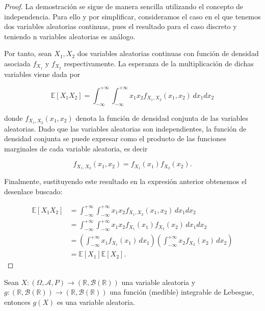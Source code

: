 \begin{proof}
    La demostración se sigue de manera sencilla utilizando el concepto de independencia. Para ello y por simplificar, consideramos el caso en el que tenemos dos variables aleatorias continuas, pues el resultado para el caso discreto y teniendo n variables aleatorias es análogo.\newline

    Por tanto, sean $X_1, X_2$ dos variables aleatorias continuas con función de densidad asociada $f_{X_1}$ y $f_{X_2}$ respectivamente. La esperanza de la multiplicación de dichas variables viene dada por

    \[ \mathbb{E}[X_1X_2] = \int_{-\infty}^{+\infty}\int_{-\infty}^{+\infty} x_1x_2 f_{X_1, X_2} (x_1, x_2) \, dx_1dx_2 \]

    donde $f_{X_1, X_2} (x_1, x_2)$ denota la función de densidad conjunta de las variables aleatorias. Dado que las variables aleatorias son independientes, la función de densidad conjunta se puede expresar como el producto de las funciones marginales de cada variable aleatoria, es decir

    \[ f_{X_1, X_2} (x_1, x_2) = f_{X_1}(x_1) f_{X_2}(x_2). \]\newline

    Finalmente, sustituyendo este resultado en la expresión anterior obtenemos el desenlace buscado:

    \begin{align*}
        \mathbb{E}[X_1 X_2] &= \int_{-\infty}^{+\infty} \int_{-\infty}^{+\infty} x_1 x_2 f_{X_1, X_2}(x_1, x_2) \, dx_1 dx_2 \\
        &= \int_{-\infty}^{+\infty} \int_{-\infty}^{+\infty} x_1 x_2 f_{X_1}(x_1) f_{X_2}(x_2) \, dx_1 dx_2 \\
        &= \left(\int_{-\infty}^{+\infty} x_1 f_{X_1}(x_1) \, dx_1\right)
           \left(\int_{-\infty}^{+\infty} x_2 f_{X_2}(x_2) \, dx_2\right) \\
        &= \mathbb{E}[X_1] \mathbb{E}[X_2].
    \end{align*}
    \newline
\end{proof}

\begin{proposicion}
    Sean $X: (\Omega, \mathcal{A}, P) \to (\mathbb{R}, \mathcal{B}(\mathbb{R}))$ una variable aleatoria y $g:(\mathbb{R},\mathcal{B}(\mathbb{R})) \to (\mathbb{R},\mathcal{B}(\mathbb{R}))$ una función (medible) integrable de Lebesgue, entonces $g(X)$ es una variable aleatoria.\newline
\end{proposicion}

